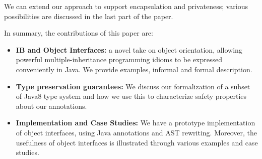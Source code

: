 We can extend our approach to support encapsulation and privateness;
various possibilities are discussed in the last part of the paper.


In summary, the contributions of this paper are:
\begin{itemize}

\item {\bf IB and Object Interfaces:} a novel take on object orientation, allowing
  powerful multiple-inheritance programming idioms to be expressed
  conveniently in Java. We provide examples, informal and formal description.

\item{\bf Type preservation guarantees:}
We discuss our formalization of a subset of Java8 type system and how we use this
to characterize safety properties about our annotations.

\item {\bf Implementation and Case Studies:} We have a prototype
  implementation of object interfaces, using Java
  annotations and AST rewriting. Moreover, the usefulness of object interfaces is
  illustrated through various examples and case studies.


\end{itemize}
